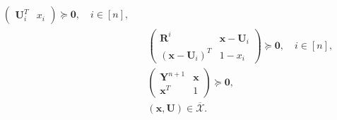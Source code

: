 \documentclass[opre,nonblindrev]{informs3} %
\begin{document}
\begin{theorem}
\begin{subequations}
\begin{align}
\begin{pmatrix}
                        \boldsymbol{U}_i^T & x_i
                   \end{pmatrix} \succeq \boldsymbol{0}, \quad i \in [n], \label{eq:best_slc_degree3_j} \\ 
               &\quad \begin{pmatrix}
                        \boldsymbol{R}^i & \boldsymbol{x}-\boldsymbol{U}_i \\
                        \left(\boldsymbol{x}-\boldsymbol{U}_i\right)^T & 1-x_i
                   \end{pmatrix} \succeq \boldsymbol{0}, \quad i \in [n], \label{eq:best_slc_degree3_k} \\ 
             &\quad \begin{pmatrix}
                        \boldsymbol{Y}^{n+1} & \boldsymbol{x} \\
                        \boldsymbol{x}^T & 1
                   \end{pmatrix} \succeq \boldsymbol{0}, \label{eq:best_slc_degree3_l} \\
              &\quad \left( \boldsymbol{x}, \boldsymbol{U} \right) \in \overline{\mathcal{X}}. \label{eq:best_slc_degree3_m}
			\end{align}
\end{subequations}
\end{theorem} 
\end{document}
